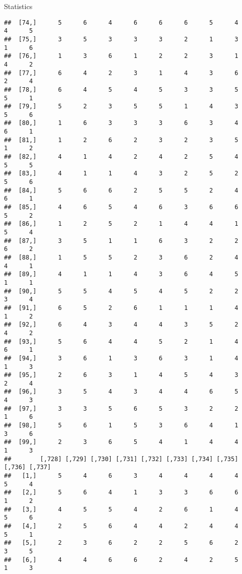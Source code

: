 \documentclass[
  ignorenonframetext,
]{beamer}
\begin{document}
\begin{frame}[fragile]{Statistics}
\begin{verbatim}
##  [74,]      5      6      4      6      6      6      5      4      4      5
##  [75,]      3      5      3      3      3      2      1      3      1      6
##  [76,]      1      3      6      1      2      2      3      1      4      2
##  [77,]      6      4      2      3      1      4      3      6      2      4
##  [78,]      6      4      5      4      5      3      3      5      5      1
##  [79,]      5      2      3      5      5      1      4      3      5      6
##  [80,]      1      6      3      3      3      6      3      4      6      1
##  [81,]      1      2      6      2      3      2      3      5      1      2
##  [82,]      4      1      4      2      4      2      5      4      5      5
##  [83,]      4      1      1      4      3      2      5      2      5      6
##  [84,]      5      6      6      2      5      5      2      4      6      1
##  [85,]      4      6      5      4      6      3      6      6      5      2
##  [86,]      1      2      5      2      1      4      4      1      5      4
##  [87,]      3      5      1      1      6      3      2      2      6      2
##  [88,]      1      5      5      2      3      6      2      4      4      1
##  [89,]      4      1      1      4      3      6      4      5      1      1
##  [90,]      5      5      4      5      4      5      2      2      3      4
##  [91,]      6      5      2      6      1      1      1      4      1      2
##  [92,]      6      4      3      4      4      3      5      2      4      2
##  [93,]      5      6      4      4      5      2      1      4      6      1
##  [94,]      3      6      1      3      6      3      1      4      1      3
##  [95,]      2      6      3      1      4      5      4      3      2      4
##  [96,]      3      5      4      3      4      4      6      5      4      3
##  [97,]      3      3      5      6      5      3      2      2      1      6
##  [98,]      5      6      1      5      3      6      4      1      3      6
##  [99,]      2      3      6      5      4      1      4      4      1      3
##        [,728] [,729] [,730] [,731] [,732] [,733] [,734] [,735] [,736] [,737]
##   [1,]      5      4      6      3      4      4      4      4      5      4
##   [2,]      5      6      4      1      3      3      6      6      1      2
##   [3,]      4      5      5      4      2      6      1      4      5      6
##   [4,]      2      5      6      4      4      2      4      4      5      1
##   [5,]      2      3      6      2      2      5      6      2      3      5
##   [6,]      4      4      6      6      2      4      2      5      1      3

\end{verbatim}
\end{frame}
\end{document}
